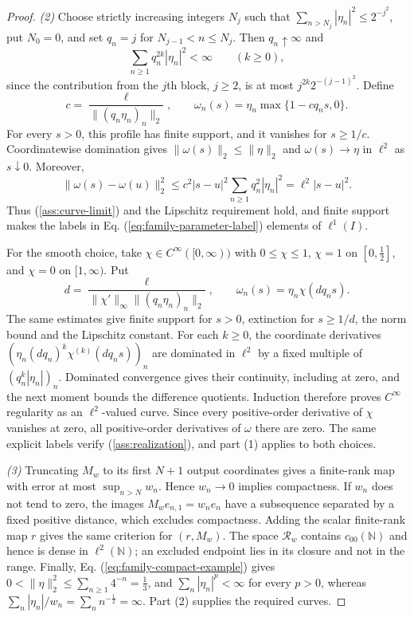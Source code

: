 \documentclass[11pt]{article}
\newcommand{\N}{\mathbb N}
\theoremstyle{definition}
\theoremstyle{remark}
\begin{document}
\begin{proof}
\noindent\textit{(2)} Choose strictly increasing integers $N_j$ such that $\sum_{n>N_j}|\eta_n|^2\le2^{-j^2}$, put $N_0=0$, and set $q_n=j$ for $N_{j-1}<n\le N_j$. Then $q_n\uparrow\infty$ and
\[
\sum_{n\ge1}q_n^{2k}|\eta_n|^2<\infty\qquad(k\ge0),
\]
since the contribution from the $j$th block, $j\ge2$, is at most $j^{2k}2^{-(j-1)^2}$. Define
\begin{equation}
c=\frac{\ell}{\|(q_n\eta_n)_n\|_2},\qquad
\omega_n(s)=\eta_n\max\{1-cq_ns,0\}.
\label{eq:family-linear-cutoff}
\end{equation}
For every $s>0$, this profile has finite support, and it vanishes for $s\ge1/c$. Coordinatewise domination gives $\|\omega(s)\|_2\le\|\eta\|_2$ and $\omega(s)\to\eta$ in $\ell^2$ as $s\downarrow0$. Moreover,
\[
\|\omega(s)-\omega(u)\|_2^2
\le c^2|s-u|^2\sum_{n\ge1}q_n^2|\eta_n|^2
=\ell^2|s-u|^2.
\]
Thus \textup{(\ref{ass:curve-limit})} and the Lipschitz requirement hold, and finite support makes the labels in Eq. (\ref{eq:family-parameter-label}) elements of $\ell^1(I)$.

For the smooth choice, take $\chi\in C^\infty([0,\infty))$ with $0\le\chi\le1$, $\chi=1$ on $[0,\frac12]$, and $\chi=0$ on $[1,\infty)$. Put
\begin{equation}
d=\frac{\ell}{\|\chi'\|_\infty\|(q_n\eta_n)_n\|_2},\qquad
\omega_n(s)=\eta_n\chi(dq_ns).
\label{eq:family-smooth-cutoff}
\end{equation}
The same estimates give finite support for $s>0$, extinction for $s\ge1/d$, the norm bound and the Lipschitz constant. For each $k\ge0$, the coordinate derivatives $(\eta_n(dq_n)^k\chi^{(k)}(dq_ns))_n$ are dominated in $\ell^2$ by a fixed multiple of $(q_n^k|\eta_n|)_n$. Dominated convergence gives their continuity, including at zero, and the next moment bounds the difference quotients. Induction therefore proves $C^\infty$ regularity as an $\ell^2$-valued curve. Since every positive-order derivative of $\chi$ vanishes at zero, all positive-order derivatives of $\omega$ there are zero. The same explicit labels verify \textup{(\ref{ass:realization})}, and part (1) applies to both choices.

\noindent\textit{(3)} Truncating $M_w$ to its first $N+1$ output coordinates gives a finite-rank map with error at most $\sup_{n>N}w_n$. Hence $w_n\to0$ implies compactness. If $w_n$ does not tend to zero, the images $M_we_{n,1}=w_ne_n$ have a subsequence separated by a fixed positive distance, which excludes compactness. Adding the scalar finite-rank map $r$ gives the same criterion for $(r,M_w)$. The space $\mathcal R_w$ contains $c_{00}(\N)$ and hence is dense in $\ell^2(\N)$; an excluded endpoint lies in its closure and not in the range. Finally, Eq. (\ref{eq:family-compact-example}) gives $0<\|\eta\|_2^2\le\sum_{n\ge1}4^{-n}=\frac13$, and $\sum_n|\eta_n|^p<\infty$ for every $p>0$, whereas $\sum_n|\eta_n|/w_n=\sum_n n^{-\frac12}=\infty$. Part (2) supplies the required curves.
\end{proof}
\end{document}
